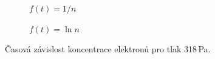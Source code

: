\documentclass[a4paper,12pt]{article}
\begin{document}
\begin{figure}[h]
	\centering
	\begin{subfigure}[b]{.49\linewidth}
		\centering
		\caption{$f(t) = 1/n$}
	\end{subfigure}
	\begin{subfigure}[b]{.49\linewidth}
		\centering
		\caption{$f(t) = \ln n$}
	\end{subfigure}
	\caption{Časová závislost koncentrace elektronů pro tlak 318\,Pa.}
	\label{g:200Pa}
\end{figure}
\end{document}
